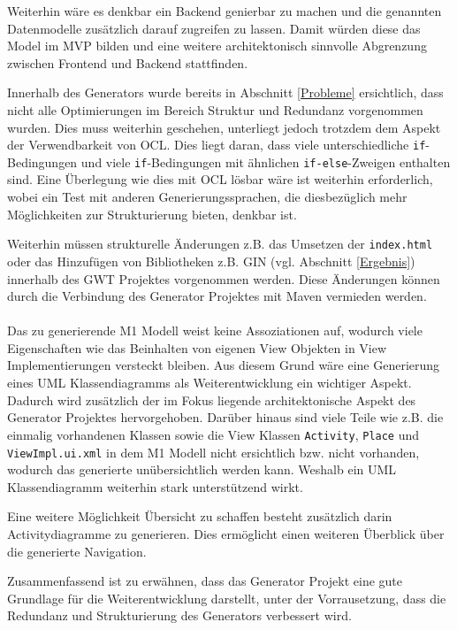 Weiterhin wäre es denkbar ein Backend genierbar zu machen und die
genannten Datenmodelle zusätzlich darauf zugreifen zu lassen. Damit würden
diese das Model im MVP bilden und eine weitere architektonisch sinnvolle Abgrenzung zwischen Frontend
und Backend stattfinden.

Innerhalb des Generators wurde bereits in Abschnitt \ref{Probleme} ersichtlich,
dass nicht alle Optimierungen im Bereich Struktur und Redundanz vorgenommen wurden.
Dies muss weiterhin geschehen, unterliegt jedoch trotzdem dem Aspekt der
Verwendbarkeit von OCL. Dies liegt daran, dass viele
unterschiedliche \texttt{if}-Bedingungen und viele \texttt{if}-Bedingungen mit
ähnlichen \texttt{if-else}-Zweigen enthalten sind. Eine Überlegung wie dies mit
OCL lösbar wäre ist weiterhin erforderlich, wobei ein Test mit anderen Generierungssprachen,
die diesbezüglich mehr Möglichkeiten zur Strukturierung bieten, denkbar ist.

Weiterhin müssen strukturelle Änderungen z.B. das Umsetzen der
\texttt{index.html} oder das Hinzufügen von Bibliotheken z.B. GIN (vgl.
Abschnitt \ref{Ergebnis}) innerhalb des GWT Projektes vorgenommen werden. Diese
Änderungen können durch die Verbindung des Generator Projektes mit Maven vermieden werden.
\\\\
Das zu generierende M1 Modell weist keine Assoziationen auf, wodurch viele
Eigenschaften wie das Beinhalten von eigenen View Objekten in View
Implementierungen versteckt bleiben. Aus diesem Grund wäre eine Generierung
eines UML Klassendiagramms als Weiterentwicklung ein wichtiger Aspekt. Dadurch wird zusätzlich der im Fokus
liegende architektonische Aspekt des Generator Projektes hervorgehoben.
Darüber hinaus sind viele Teile wie z.B. die einmalig vorhandenen Klassen sowie die View
Klassen \texttt{Activity}, \texttt{Place} und \texttt{ViewImpl.ui.xml} in
dem M1 Modell nicht ersichtlich bzw. nicht vorhanden, wodurch das generierte
unübersichtlich werden kann. Weshalb ein UML Klassendiagramm weiterhin stark unterstützend wirkt. 

Eine weitere Möglichkeit Übersicht zu schaffen besteht zusätzlich darin
Activitydiagramme zu generieren. Dies ermöglicht einen weiteren Überblick über
die generierte Navigation.

Zusammenfassend ist zu erwähnen, dass das Generator Projekt eine gute
Grundlage für die Weiterentwicklung darstellt, unter der Vorrausetzung, dass die
Redundanz und Strukturierung des Generators verbessert wird.